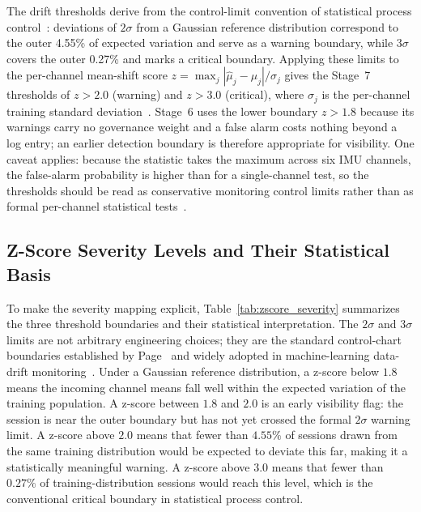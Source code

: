 The drift thresholds derive from the control-limit convention of statistical process
control~\cite{page1954cusum}: deviations of $2\sigma$ from a Gaussian reference distribution
correspond to the outer 4.55\% of expected variation and serve as a warning boundary, while
$3\sigma$ covers the outer 0.27\% and marks a critical boundary. Applying these limits to the
per-channel mean-shift score $z = \max_j |\hat{\mu}_j - \mu_j|/\sigma_j$ gives the Stage~7
thresholds of $z > 2.0$ (warning) and $z > 3.0$ (critical), where $\sigma_j$ is the per-channel
training standard deviation~\cite{gama2014survey}. Stage~6 uses the lower boundary $z > 1.8$
because its warnings carry no governance weight and a false alarm costs nothing beyond a log entry;
an earlier detection boundary is therefore appropriate for visibility. One caveat applies: because
the statistic takes the maximum across six IMU channels, the false-alarm probability is higher than
for a single-channel test, so the thresholds should be read as conservative monitoring control
limits rather than as formal per-channel statistical tests~\cite{bodor2023mlopsmonitoring}.

\subsection{Z-Score Severity Levels and Their Statistical Basis}
\label{sec:zscore_severity}

To make the severity mapping explicit, Table~\ref{tab:zscore_severity} summarizes the three
threshold boundaries and their statistical interpretation. The $2\sigma$ and $3\sigma$ limits are
not arbitrary engineering choices; they are the standard control-chart boundaries established by
Page~\cite{page1954cusum} and widely adopted in machine-learning data-drift
monitoring~\cite{gama2014survey,bodor2023mlopsmonitoring}. Under a Gaussian reference
distribution, a z-score below $1.8$ means the incoming channel means fall well within the
expected variation of the training population. A z-score between $1.8$ and $2.0$ is an early
visibility flag: the session is near the outer boundary but has not yet crossed the formal
$2\sigma$ warning limit. A z-score above $2.0$ means that fewer than $4.55\%$ of sessions
drawn from the same training distribution would be expected to deviate this far, making it a
statistically meaningful warning. A z-score above $3.0$ means that fewer than $0.27\%$ of
training-distribution sessions would reach this level, which is the conventional critical
boundary in statistical process control.

